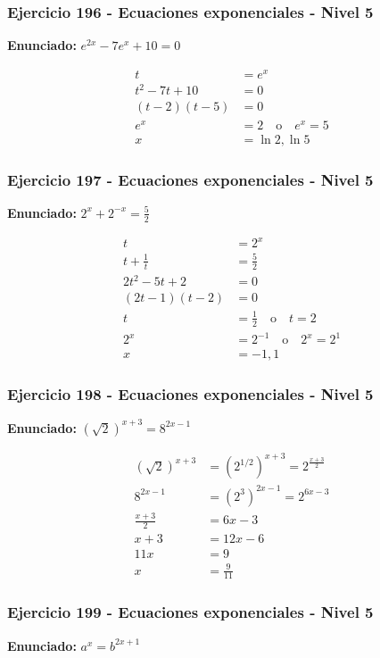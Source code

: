 \documentclass[12pt,a4paper]{article}
\begin{document}
\subsubsection*{Ejercicio 196 - Ecuaciones exponenciales - Nivel 5}
\textbf{Enunciado:} \(e^{2x}-7e^x+10=0\)

\[
\begin{aligned}
t&=e^x\\
t^2-7t+10&=0\\
(t-2)(t-5)&=0\\
e^x&=2\quad \text{o}\quad e^x=5\\
x&=\boxed{\ln2,\ln5}
\end{aligned}
\]


\subsubsection*{Ejercicio 197 - Ecuaciones exponenciales - Nivel 5}
\textbf{Enunciado:} \(2^x+2^{-x}=\frac52\)

\[
\begin{aligned}
t&=2^x\\
t+\frac1t&=\frac52\\
2t^2-5t+2&=0\\
(2t-1)(t-2)&=0\\
t&=\frac12\quad \text{o}\quad t=2\\
2^x&=2^{-1}\quad \text{o}\quad 2^x=2^1\\
x&=\boxed{-1,1}
\end{aligned}
\]


\subsubsection*{Ejercicio 198 - Ecuaciones exponenciales - Nivel 5}
\textbf{Enunciado:} \((\sqrt2)^{x+3}=8^{2x-1}\)

\[
\begin{aligned}
(\sqrt2)^{x+3}&=(2^{1/2})^{x+3}=2^{\frac{x+3}{2}}\\
8^{2x-1}&=(2^3)^{2x-1}=2^{6x-3}\\
\frac{x+3}{2}&=6x-3\\
x+3&=12x-6\\
11x&=9\\
x&=\boxed{\frac9{11}}
\end{aligned}
\]


\subsubsection*{Ejercicio 199 - Ecuaciones exponenciales - Nivel 5}
\textbf{Enunciado:} \(a^x=b^{2x+1}\)
\end{document}
